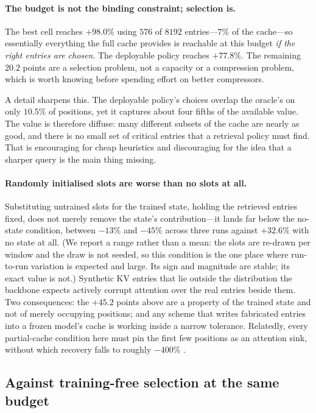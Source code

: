 \documentclass[11pt]{article}
\begin{document}
\paragraph{The budget is not the binding constraint; selection is.}
The best cell reaches $+98.0\%$ using $576$ of $8192$ entries---$7\%$ of the
cache---so essentially everything the full cache provides is reachable at this
budget \emph{if the right entries are chosen}. The deployable policy reaches
$+77.8\%$. The remaining $20.2$ points are a selection problem, not a capacity or
a compression problem, which is worth knowing before spending effort on better
compressors.

A detail sharpens this. The deployable policy's choices overlap the oracle's on
only $10.5\%$ of positions, yet it captures about four fifths of the available
value. The value is therefore diffuse: many different subsets of the
cache are nearly as good, and there is no small set of critical entries that a
retrieval policy must find. That is encouraging for cheap heuristics and
discouraging for the idea that a sharper query is the main thing missing.

\paragraph{Randomly initialised slots are worse than no slots at all.}
Substituting untrained slots for the trained state, holding the retrieved entries
fixed, does not merely remove the state's contribution---it lands far below the
no-state condition, between $-13\%$ and $-45\%$ across three runs against
$+32.6\%$ with no state at all. (We report a range rather than a mean: the slots are re-drawn
per window and the draw is not seeded, so this condition is the one place where
run-to-run variation is expected and large. Its sign and magnitude are stable;
its exact value is not.) Synthetic
KV entries that lie outside the distribution the backbone expects actively
corrupt attention over the real entries beside them. Two consequences: the
$+45.2$ points above are a property of the trained state and not of merely
occupying positions; and any scheme that writes fabricated entries into a frozen
model's cache is working inside a narrow tolerance. Relatedly, every partial-cache
condition here must pin the first few positions as an attention sink, without
which recovery falls to roughly $-400\%$ \citep{streamingllm}.

\subsection{Against training-free selection at the same budget}
\label{sec:baselines}
\end{document}

